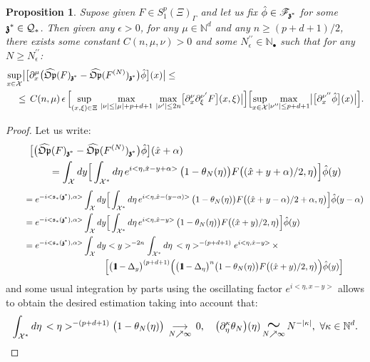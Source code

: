 \documentclass[12pt]{article}
\newtheorem{proposition}[theorem]{Proposition}
\theoremstyle{definition}
\def\Op{\mathfrak{Op}}
\def\X{\mathcal X}
\def\T{\mathcal{Q}}
\def\bb1{{\rm{1}\hspace{-3pt}\mathbf{l}}}
\def\s{\mathfrak{s}}
\def\bz{\mathfrak{z}\hspace*{-4pt}\mathfrak{z}}
\def\Nb{\mathbb{N}_{\bullet}}
\numberwithin{equation}{section}
\begin{document}
\begin{proposition}\label{P-II-10}
	Supose given $F\in{S}^p_1(\Xi)_{\Gamma}$ and let us fix $\hat{\phi}\in\mathscr{F}_{\bz^*}$ for some $\bz^*\in\T_*$. Then given any $\epsilon>0$, for any $\mu\in\mathbb{N}^d$ and any $n\geq(p+d+1)/2$, there exists some constant $C(n,\mu,\nu)>0$ and some $N^{\prime\prime}_\epsilon\in\Nb$ such that for any $N\geq{N}^{\prime\prime}_\epsilon$:
	\begin{align}\label{F-II-10}
	&\underset{x\in\X}{\sup}\big|\big[\partial_x^\mu\big(\widehat{\Op}(F)_{\bz^*}-\widehat{\Op}(F^{(N)})_{\bz^*}\big)\hat{\phi}\big](x)\big|\leq\\ \nonumber
	&\quad\leq\,C(n,\mu)\,\epsilon\,\Big[\underset{(x,\xi)\in\Xi}{\sup}\ \underset{|\nu|\leq|\mu|+p+d+1}{\max}\ \underset{|\nu^\prime|\leq2n}{\max}\big[\partial_x^\nu\partial_\xi^{\nu^\prime}F\big](x,\xi)\big|\Big]\Big[\underset{x\in\X}{\sup}\underset{|\nu^{\prime\prime}|\leq p+d+1}{\max}\big|\big[\partial_x^{\nu^{\prime\prime}}\hat{\phi}\big](x)\big|\Big].
\end{align}
\end{proposition}
\begin{proof} Let us write:
\begin{align}
	&\big[\big(\widehat{\Op}(F)_{\bz^*}-\widehat{\Op}(F^{(N)})_{\bz^*}\big)\hat{\phi}\big](\hat{x}+\alpha)\\ \nonumber
	&\qquad=\int_{\X}dy\Big[\int_{\X^*}d\eta\,e^{i<\eta,\hat{x}-y+\alpha>}\,\big(1-\theta_N(\eta)\big)F\big((\hat{x}+y+\alpha)/2,\eta\big)\Big]\hat{\phi}(y)
\end{align}
\begin{align*}
&\qquad=e^{-i<\s_*(\bz^*),\alpha>}\int_{\X}dy\Big[\int_{\X^*}d\eta\,e^{i<\eta,\hat{x}-(y-\alpha)>}\,\big(1-\theta_N(\eta)\big)
{F\big((\hat{x}+y-\alpha)/2+\alpha,\eta\big)}\Big]\hat{\phi}(y-\alpha)\\
&\qquad=e^{-i<\s_*(\bz^*),\alpha>}\int_{\X}dy
\Big[\int_{\X^*}d\eta\,
e^{i<\eta,\hat{x}-y>}\,\big(1-\theta_N(\eta)\big)
F\big((\hat{x}+y)/2,\eta\big)\Big]\hat{\phi}(y)\\
&\qquad=e^{-i<\s_*(\bz^*),\alpha>}\int_{\X}dy<y>^{-2n}\int_{\X^*}d\eta\,<\eta>^{-(p+d+1)}e^{i<\eta,\hat{x}-y>}\,\times\\
&\hspace*{4cm}\Big[\big(\bb1-\Delta_{y}\big)^{(p+d+1)}\Big(\big(\bb1-\Delta_{\eta}\big)^n\big(1-\theta_N(\eta)\big)F\big((\hat{x}+y)/2,\eta\big)\Big)\hat{\phi}(y)\Big]
\end{align*}
and some usual integration by parts using the oscillating factor $e^{i<\eta,x-y>}$ allows to obtain the desired estimation taking into account that:
\begin{align}
	\int_{\X^*}d\eta\,<\eta>^{-(p+d+1)}\big(1-\theta_N(\eta)\big)\,\underset{N\nearrow\infty}{\longrightarrow}\,0,\quad\big(\partial_\eta^{\kappa}\theta_N\big)(\eta)\,\underset{N\nearrow\infty}{\text{\LARGE{$\sim$}}}\,N^{-|\kappa|},\ \forall\kappa\in\mathbb{N}^d.
\end{align}
\end{proof}
\end{document}
